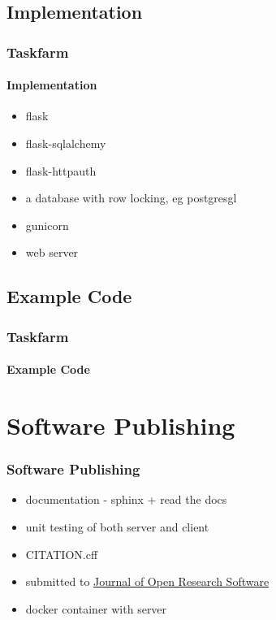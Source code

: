 \subsection{Implementation}
\begin{frame}
  \frametitle{Taskfarm}
  \framesubtitle{Implementation} 
  \begin{itemize}
  \item flask
  \item flask-sqlalchemy
  \item flask-httpauth
  \item a database with row locking, eg postgresgl
  \item gunicorn
  \item web server
  \end{itemize}
\end{frame}

\subsection{Example Code}
\begin{frame}
  \frametitle{Taskfarm}
  \framesubtitle{Example Code}
  {\footnotesize
    
    }
\end{frame}

\section{Software Publishing}
\begin{frame}
  \frametitle{Software Publishing}
  \begin{itemize}
  \item<1-> documentation - sphinx + read the docs
  \item<2-> unit testing of both server and client
  \item<3-> CITATION.cff
  \item<4-> submitted to \href{https://openresearchsoftware.metajnl.com/}{\color{blue} Journal of Open Research Software}
  \item<5-> docker container with server
  \end{itemize}
  \begin{flushright}
  \end{flushright}
\end{frame}


